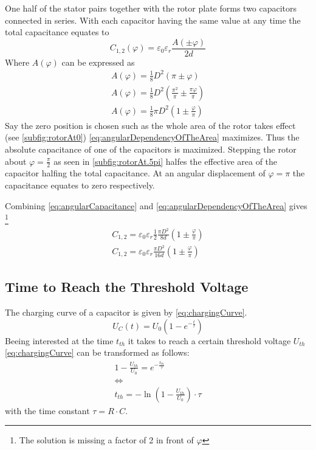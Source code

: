         One half of the stator pairs together with the rotor plate forms two capacitors connected in series. With each
        capacitor having the same value at any time the total capacitance equates to
        \begin{equation}
            C_{1,2}(\varphi) = \varepsilon_0 \varepsilon_r \frac{A(\pm\varphi)}{2d}
            \label{eq:angularCapacitance}
        \end{equation}
        Where \( A(\varphi) \) can be expressed as
        \begin{align}
            A(\varphi) = \frac{1}{8}D^2 \left( \pi \pm \varphi \right) \nonumber \\
            A(\varphi) = \frac{1}{8}D^2 \left( \frac{\pi^2}{\pi} \pm \frac{\pi\varphi}{\pi} \right) \nonumber \\
            A(\varphi) = \frac{1}{8} \pi D^2 \left( 1 \pm \frac{\varphi}{\pi}\right)
            \label{eq:angularDependencyOfTheArea}
        \end{align}
        Say the zero position is chosen such as the whole area of the rotor takes effect (see \cref{subfig:rotorAt0})
        \cref{eq:angularDependencyOfTheArea} maximizes. Thus the absolute capacitance of one of the capacitors is maximized.
        Stepping the rotor about \( \varphi = \frac{\pi}{2} \) as seen in \cref{subfig:rotorAt.5pi} halfes the
        effective area of the capacitor halfing the total capacitance. At an angular displacement of \( \varphi = \pi \)
        the capacitance equates to zero respectively.\par
        Combining \cref{eq:angularCapacitance} and \cref{eq:angularDependencyOfTheArea} gives \footnote{The solution is missing a factor of 2 in front of \(\varphi\)}
        \begin{align}
            C_{1,2} = \varepsilon_0 \varepsilon_r \frac{1}{2} \frac{\pi D^2}{8d} \left( 1 \pm \frac{\varphi}{\pi} \right) \nonumber \\
            C_{1,2} = \varepsilon_0 \varepsilon_r \frac{\pi D^2}{16d} \left( 1 \pm \frac{\varphi}{\pi} \right)
        \end{align}
    \subsection*{Time to Reach the Threshold Voltage}
        The charging curve of a capacitor is given by \cref{eq:chargingCurve}.
        \begin{equation}
            U_C(t) = U_0 ( 1-e^{-\frac{t}{\tau}})
            \label{eq:chargingCurve}
        \end{equation}
        Beeing interested at the time \( t_{th} \) it takes to reach a certain threshold voltage \( U_{th} \) \cref{eq:chargingCurve}
        can be transformed as follows:
        \begin{align}
            1- \frac{U_{th}}{U_0} = e^{-\frac{t_{th}}{\tau}} \nonumber \\
            \Leftrightarrow \nonumber \\
            t_{th} = - \ln(1- \frac{U_{th}}{U_0}) \cdot \tau
            \label{eq:timeToThresholfVoltage}
        \end{align}
        with the time constant \( \tau = R \cdot C \).
